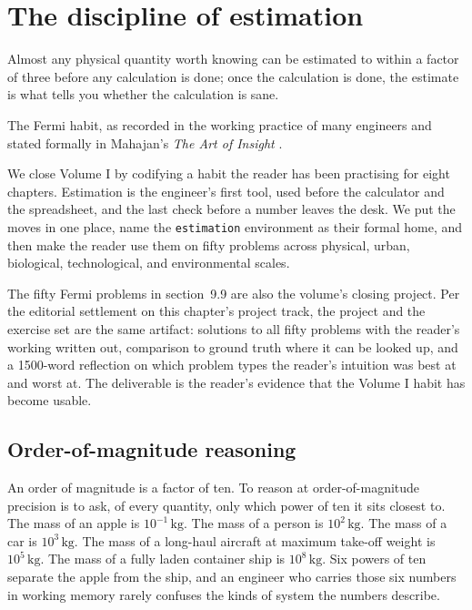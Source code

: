 \chapter{The discipline of estimation}
\label{vol01:ch09}

\epigraph{Almost any physical quantity worth knowing can be estimated to
within a factor of three before any calculation is done; once the
calculation is done, the estimate is what tells you whether the
calculation is sane.}{The Fermi habit, as recorded in the working
practice of many engineers and stated formally in Mahajan's \emph{The Art
of Insight} \cite{text:mahajan2014}.}


\noindent
We close Volume I by codifying a habit the reader has been practising for
eight chapters. Estimation is the engineer's first tool, used before the
calculator and the spreadsheet, and the last check before a number leaves
the desk. We put the moves in one place, name the \verb|estimation|
environment as their formal home, and then make the reader use them on
fifty problems across physical, urban, biological, technological, and
environmental scales.

The fifty Fermi problems in section~9.9 are also the volume's closing
project. Per the editorial settlement on this chapter's project track,
the project and the exercise set are the same artifact: solutions to all
fifty problems with the reader's working written out, comparison to
ground truth where it can be looked up, and a 1500-word reflection on
which problem types the reader's intuition was best at and worst at.
The deliverable is the reader's evidence that the Volume I habit has
become usable.

\section{Order-of-magnitude reasoning}

An order of magnitude is a factor of ten. To reason at order-of-magnitude
precision is to ask, of every quantity, only which power of ten it
sits closest to. The mass of an apple is $10^{-1} \,\si{\kilogram}$. The
mass of a person is $10^{2} \,\si{\kilogram}$. The mass of a car is
$10^{3} \,\si{\kilogram}$. The mass of a long-haul aircraft at maximum
take-off weight is $10^{5} \,\si{\kilogram}$. The mass of a fully laden
container ship is $10^{8} \,\si{\kilogram}$. Six powers of ten separate
the apple from the ship, and an engineer who carries those six numbers in
working memory rarely confuses the kinds of system the numbers describe.

